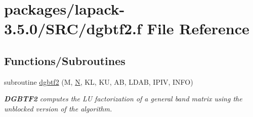 \hypertarget{dgbtf2_8f}{}\section{packages/lapack-\/3.5.0/\+S\+R\+C/dgbtf2.f File Reference}
\label{dgbtf2_8f}
\subsection*{Functions/\+Subroutines}
\begin{DoxyCompactItemize}
\item 
subroutine \hyperlink{group__doubleGBcomputational_gad1efab86e6d869915e059286ecf1bcb1}{dgbtf2} (M, \hyperlink{polmisc_8c_a0240ac851181b84ac374872dc5434ee4}{N}, K\+L, K\+U, A\+B, L\+D\+A\+B, I\+P\+I\+V, I\+N\+F\+O)
\begin{DoxyCompactList}\small\item\em {\bfseries D\+G\+B\+T\+F2} computes the L\+U factorization of a general band matrix using the unblocked version of the algorithm. \end{DoxyCompactList}\end{DoxyCompactItemize}
